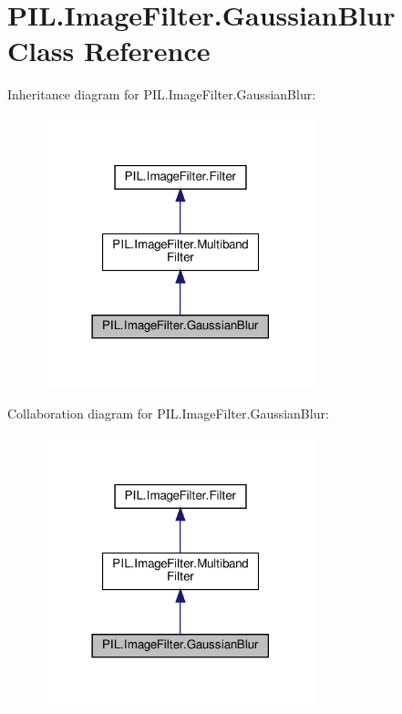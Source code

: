 \hypertarget{classPIL_1_1ImageFilter_1_1GaussianBlur}{}\section{P\+I\+L.\+Image\+Filter.\+Gaussian\+Blur Class Reference}
\label{classPIL_1_1ImageFilter_1_1GaussianBlur}


Inheritance diagram for P\+I\+L.\+Image\+Filter.\+Gaussian\+Blur\+:
\nopagebreak
\begin{figure}[H]
\begin{center}
\leavevmode
\includegraphics[width=225pt]{classPIL_1_1ImageFilter_1_1GaussianBlur__inherit__graph}
\end{center}
\end{figure}


Collaboration diagram for P\+I\+L.\+Image\+Filter.\+Gaussian\+Blur\+:
\nopagebreak
\begin{figure}[H]
\begin{center}
\leavevmode
\includegraphics[width=225pt]{classPIL_1_1ImageFilter_1_1GaussianBlur__coll__graph}
\end{center}
\end{figure}
